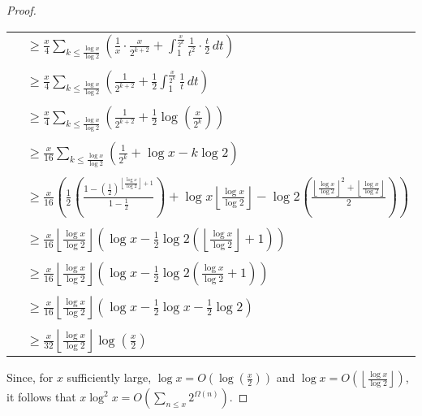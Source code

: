 \documentclass[12pt]{article}
\begin{document}
\begin{proof}
\begin{center}
\begin{tabular}{ll}
\\
& $\displaystyle \ge \frac{x}{4} \sum_{k \le \frac{\log x}{\log 2}} \left( \frac{1}{x} \cdot \frac{x}{2^{k+2}}+\int_1^{\frac{x}{2^k}} \frac{1}{t^2} \cdot \frac{t}{2} \, dt \right)$ \\
\\
& $\displaystyle \ge \frac{x}{4} \sum_{k \le \frac{\log x}{\log 2}} \left( \frac{1}{2^{k+2}}+\frac{1}{2}\int_1^{\frac{x}{2^k}} \frac{1}{t} \, dt \right)$ \\
\\
& $\displaystyle \ge \frac{x}{4} \sum_{k \le \frac{\log x}{\log 2}} \left( \frac{1}{2^{k+2}}+\frac{1}{2}\log\left( \frac{x}{2^k} \right) \right)$ \\
\\
& $\displaystyle \ge \frac{x}{16} \sum_{k \le \frac{\log x}{\log 2}} \left( \frac{1}{2^k}+\log x-k\log 2 \right)$ \\
\\
& $\displaystyle \ge \frac{x}{16} \left( \frac{1}{2} \left( \frac{1-\left( \frac{1}{2} \right)^{\left\lfloor \frac{\log x}{\log 2} \right\rfloor +1}}{1-\frac{1}{2}} \right)+\log x \left\lfloor \frac{\log x}{\log 2} \right\rfloor -\log 2 \left( \frac{ \left\lfloor \frac{\log x}{\log 2} \right\rfloor^2+\left\lfloor \frac{\log x}{\log 2} \right\rfloor }{2} \right) \right)$ \\
\\
& $\displaystyle \ge \frac{x}{16} \left\lfloor \frac{\log x}{\log 2} \right\rfloor \left( \log x-\frac{1}{2}\log 2 \left( \left\lfloor \frac{\log x}{\log 2} \right\rfloor +1 \right) \right)$ \\
\\
& $\displaystyle \ge \frac{x}{16} \left\lfloor \frac{\log x}{\log 2} \right\rfloor \left( \log x-\frac{1}{2}\log 2 \left( \frac{\log x}{\log 2}+1 \right) \right)$ \\
\\
& $\displaystyle \ge \frac{x}{16} \left\lfloor \frac{\log x}{\log 2} \right\rfloor \left( \log x-\frac{1}{2}\log x-\frac{1}{2}\log 2 \right)$ \\
\\
& $\displaystyle \ge \frac{x}{32} \left\lfloor \frac{\log x}{\log 2} \right\rfloor \log \left( \frac{x}{2} \right)$ \end{tabular}
\end{center}

Since, for $x$ sufficiently large, $\displaystyle \log x=O\left( \log \left( \frac{x}{2} \right) \right)$ and $\displaystyle \log x=O\left( \left\lfloor \frac{\log x}{\log 2} \right\rfloor \right)$, it follows that $\displaystyle x\log^2x=O\left(\sum_{n \le x} 2^{\Omega(n)} \right)$.
\end{proof}
\end{document}

